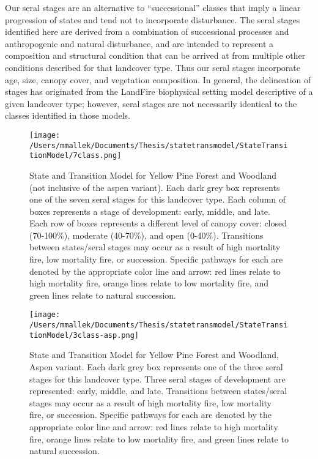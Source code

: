 Our seral stages are an alternative to ``successional'' classes that imply a linear progression of states and tend not to incorporate disturbance. The seral stages identified here are derived from a combination of successional processes and anthropogenic and natural disturbance, and are intended to represent a composition and structural condition that can be arrived at from multiple other conditions described for that landcover type. Thus our seral stages incorporate age, size, canopy cover, and vegetation composition. In general, the delineation of stages has originated from the LandFire biophysical setting model descriptive of a given landcover type; however, seral stages are not necessarily identical to the classes identified in those models.

\begin{figure}[htbp]
\centering
\texttt{[image: /Users/mmallek/Documents/Thesis/statetransmodel/StateTransitionModel/7class.png]}
\caption{State and Transition Model for Yellow Pine Forest and Woodland (not inclusive of the aspen variant). Each dark grey box represents one of the seven seral stages for this landcover type. Each column of boxes represents a stage of development: early, middle, and late. Each row of boxes represents a different level of canopy cover: closed (70-100\%), moderate (40-70\%), and open (0-40\%). Transitions between states/seral stages may occur as a result of high mortality fire, low mortality fire, or succession. Specific pathways for each are denoted by the appropriate color line and arrow: red lines relate to high mortality fire, orange lines relate to low mortality fire, and green lines relate to natural succession.} 
\label{transmodel_ypn}
\end{figure}

\begin{figure}[htbp]
\centering
\texttt{[image: /Users/mmallek/Documents/Thesis/statetransmodel/StateTransitionModel/3class-asp.png]}
\caption{State and Transition Model for Yellow Pine Forest and Woodland, Aspen variant. Each dark grey box represents one of the three seral stages for this landcover type. Three seral stages of development are represented: early, middle, and late. Transitions between states/seral stages may occur as a result of high mortality fire, low mortality fire, or succession. Specific pathways for each are denoted by the appropriate color line and arrow: red lines relate to high mortality fire, orange lines relate to low mortality fire, and green lines relate to natural succession.} 
\label{transmodel_ypn-asp}
\end{figure}

